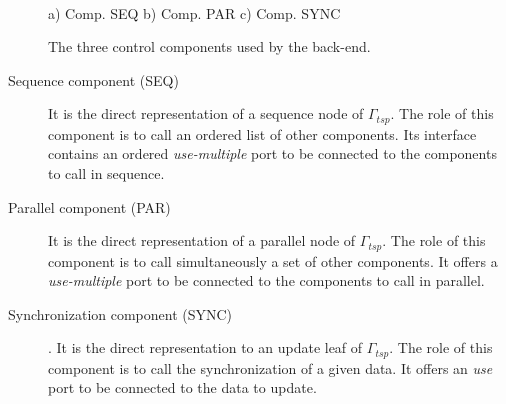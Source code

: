\begin{figure}[t]
\hspace{\fill}
\hspace{\fill}
\\
a) Comp. SEQ
\hspace{\fill}
b) Comp. PAR
\hspace{\fill}
c) Comp. SYNC
\\
\caption{The three control components used by the back-end.}
\label{fig:ctrlcomponents}
\end{figure}

\begin{description}
\item[Sequence component (SEQ)] It is the direct representation of a sequence node of $\Gamma_{tsp}$. The role of this component is to call an ordered list of other components. Its interface contains an ordered \emph{use-multiple} port to be connected to the components to call in sequence.

\item[Parallel component (PAR)] It is the direct representation of a parallel node of $\Gamma_{tsp}$. The role of this component is to call simultaneously a set of other components. It offers a \emph{use-multiple} port to be connected to the components to call in parallel.
  
\item[Synchronization component (SYNC)]. It is the direct representation to an update leaf of $\Gamma_{tsp}$. The role of this component is to call the synchronization of a given data. It offers an \emph{use} port to be connected to the data to update.

\end{description}



